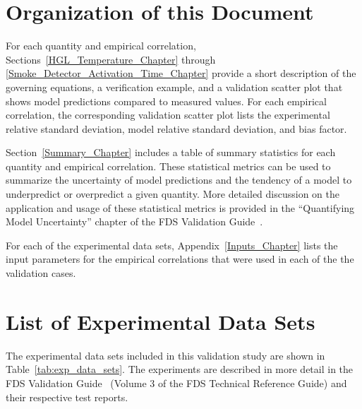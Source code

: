 \clearpage


\section{Organization of this Document}

For each quantity and empirical correlation, Sections~\ref{HGL_Temperature_Chapter} through \ref{Smoke_Detector_Activation_Time_Chapter} provide a short description of the governing equations, a verification example, and a validation scatter plot that shows model predictions compared to measured values. For each empirical correlation, the corresponding validation scatter plot lists the experimental relative standard deviation, model relative standard deviation, and bias factor.

Section~\ref{Summary_Chapter} includes a table of summary statistics for each quantity and empirical correlation. These statistical metrics can be used to summarize the uncertainty of model predictions and the tendency of a model to underpredict or overpredict a given quantity. More detailed discussion on the application and usage of these statistical metrics is provided in the ``Quantifying Model Uncertainty'' chapter of the FDS Validation Guide~\cite{FDS_Validation_Guide}.

For each of the experimental data sets, Appendix~\ref{Inputs_Chapter} lists the input parameters for the empirical correlations that were used in each of the the validation cases.

\section{List of Experimental Data Sets}

The experimental data sets included in this validation study are shown in Table~\ref{tab:exp_data_sets}. The experiments are described in more detail in the FDS Validation Guide~\cite{FDS_Validation_Guide} (Volume 3 of the FDS Technical Reference Guide) and their respective test reports.

